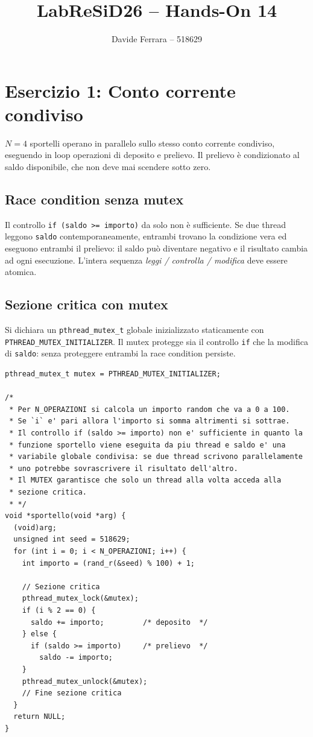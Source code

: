 \documentclass[a4paper,12pt]{article}
\title{LabReSiD26 -- Hands-On 14}
\author{Davide Ferrara -- 518629}
\date{}
\begin{document}
\maketitle

\section{Esercizio 1: Conto corrente condiviso}

$N = 4$ sportelli operano in parallelo sullo stesso conto corrente condiviso,
eseguendo in loop operazioni di deposito e prelievo.
Il prelievo è condizionato al saldo disponibile, che non deve mai scendere
sotto zero.

\subsection*{Race condition senza mutex}

Il controllo \texttt{if (saldo >= importo)} da solo non è sufficiente.
Se due thread leggono \texttt{saldo} contemporaneamente, entrambi trovano
la condizione vera ed eseguono entrambi il prelievo: il saldo può diventare
negativo e il risultato cambia ad ogni esecuzione.
L'intera sequenza \emph{leggi / controlla / modifica} deve essere atomica.

\subsection*{Sezione critica con mutex}

Si dichiara un \texttt{pthread\_mutex\_t} globale inizializzato staticamente
con \texttt{PTHREAD\_MUTEX\_INITIALIZER}.
Il mutex protegge sia il controllo \texttt{if} che la modifica di
\texttt{saldo}: senza proteggere entrambi la race condition persiste.

\begin{lstlisting}[caption={Sezione critica protetta da mutex}]
pthread_mutex_t mutex = PTHREAD_MUTEX_INITIALIZER;

/*
 * Per N_OPERAZIONI si calcola un importo random che va a 0 a 100.
 * Se `i` e' pari allora l'importo si somma altrimenti si sottrae.
 * Il controllo if (saldo >= importo) non e' sufficiente in quanto la
 * funzione sportello viene eseguita da piu thread e saldo e' una
 * variabile globale condivisa: se due thread scrivono parallelamente
 * uno potrebbe sovrascrivere il risultato dell'altro.
 * Il MUTEX garantisce che solo un thread alla volta acceda alla
 * sezione critica.
 * */
void *sportello(void *arg) {
  (void)arg;
  unsigned int seed = 518629;
  for (int i = 0; i < N_OPERAZIONI; i++) {
    int importo = (rand_r(&seed) % 100) + 1;

    // Sezione critica
    pthread_mutex_lock(&mutex);
    if (i % 2 == 0) {
      saldo += importo;         /* deposito  */
    } else {
      if (saldo >= importo)     /* prelievo  */
        saldo -= importo;
    }
    pthread_mutex_unlock(&mutex);
    // Fine sezione critica
  }
  return NULL;
}
\end{lstlisting}
\end{document}
